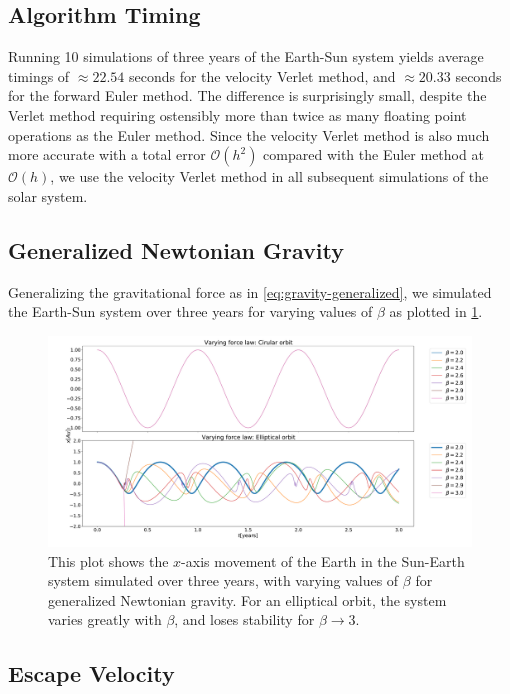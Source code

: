 \documentclass[../main.tex]{subfiles}
\begin{document}
\subsection{Algorithm Timing}

Running 10 simulations of three years of the Earth-Sun system yields average timings of $\approx 22.54$ seconds for the velocity Verlet method, and $\approx 20.33$ seconds for the forward Euler method. The difference is surprisingly small, despite the Verlet method requiring ostensibly more than twice as many floating point operations as the Euler method. Since the velocity Verlet method is also much more accurate with a total error $\mathcal{O}(h^2)$ compared with the Euler method at $\mathcal{O}(h)$, we use the velocity Verlet method in all subsequent simulations of the solar system.

\subsection{Generalized Newtonian Gravity}

Generalizing the gravitational force as in \cref{eq:gravity-generalized}, we simulated the Earth-Sun system over three years for varying values of $\beta$ as plotted in \cref{fig:varying-beta}.

\begin{figure}[htb!]
    \centering
    \includegraphics[trim=0cm 0.cm 0.cm 0.cm, clip,width=\textwidth]{../figures/varying_force.pdf}
    \caption{This plot shows the $x$-axis movement of the Earth in the Sun-Earth system simulated over three years, with varying values of $\beta$ for generalized Newtonian gravity. For an elliptical orbit, the system varies greatly with $\beta$, and loses stability for $\beta \xrightarrow{} 3$.}
    \label{fig:varying-beta}
\end{figure}

\subsection{Escape Velocity}
\end{document}
